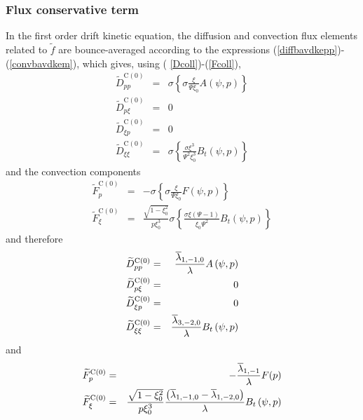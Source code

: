 
\label{dkecollisions}\subsubsection{Flux conservative term}

In the first order drift kinetic equation, the diffusion and convection flux
elements related to $\widetilde{f}$ are bounce-averaged according to the
expressions (\ref{diffbavdkepp})-(\ref{convbavdkem}), which gives, using (%
\ref{Dcoll})-(\ref{Fcoll}),
\begin{eqnarray}
\widetilde{D}_{pp}^{\text{C}(0)} &=&\sigma \left\{ \sigma \frac{\xi }{\Psi
\xi _{0}}A\left( \psi ,p\right) \right\}  \\
\widetilde{D}_{p\xi }^{\text{C}(0)} &=&0  \nonumber \\
\widetilde{D}_{\xi p}^{\text{C}(0)} &=&0  \nonumber \\
\widetilde{D}_{\xi \xi }^{\text{C}(0)} &=&\sigma \left\{ \frac{\sigma \xi
^{3}}{\Psi ^{2}\xi _{0}^{3}}B_{t}\left( \psi ,p\right) \right\}   \nonumber
\end{eqnarray}
and the convection components
\begin{eqnarray}
\widetilde{F}_{p}^{\text{C}(0)} &=&-\sigma \left\{ \sigma \frac{\xi }{\Psi
\xi _{0}}F\left( \psi ,p\right) \right\}  \\
\widetilde{F}_{\xi }^{\text{C}(0)} &=&\frac{\sqrt{1-\xi _{0}^{2}}}{p\xi
_{0}^{3}}\sigma \left\{ \frac{\sigma \xi \left( \Psi -1\right) }{\xi
_{0}\Psi ^{2}}B_{t}\left( \psi ,p\right) \right\}   \nonumber
\end{eqnarray}
and therefore
\begin{eqnarray}
\widetilde{D}_{pp}^{\text{C}(0)} &=&\frac{\overline{\lambda }_{1,-1,0}}{%
\lambda }A\left( \psi ,p\right)  \\
\widetilde{D}_{p\xi }^{\text{C}(0)} &=&0  \nonumber \\
\widetilde{D}_{\xi p}^{\text{C}(0)} &=&0  \nonumber \\
\widetilde{D}_{\xi \xi }^{\text{C}(0)} &=&\frac{\overline{\lambda }_{3,-2,0}%
}{\lambda }B_{t}\left( \psi ,p\right)   \nonumber
\end{eqnarray}
and
\begin{eqnarray}
\widetilde{F}_{p}^{\text{C}(0)} &=&-\frac{\overline{\lambda }_{1,-1}}{%
\lambda }F(p) \\
\widetilde{F}_{\xi }^{\text{C}(0)} &=&\frac{\sqrt{1-\xi _{0}^{2}}}{p\xi
_{0}^{3}}\frac{\left( \overline{\lambda }_{1,-1,0}-\overline{\lambda }%
_{1,-2,0}\right) }{\lambda }B_{t}\left( \psi ,p\right)   \nonumber
\end{eqnarray}


